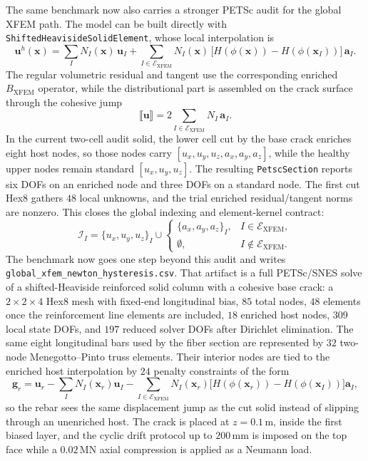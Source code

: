 The same benchmark now also carries a stronger PETSc audit for the global XFEM
path.  The model can be built directly with
\texttt{ShiftedHeavisideSolidElement}, whose local interpolation is
\[
  \mathbf{u}^h(\mathbf{x}) =
  \sum_I N_I(\mathbf{x})\,\mathbf{u}_I
  + \sum_{I\in\mathcal{E}_{\mathrm{XFEM}}}
    N_I(\mathbf{x})\,
    \bigl[H(\phi(\mathbf{x}))-H(\phi(\mathbf{x}_I))\bigr]\,
    \mathbf{a}_I .
\]
The regular volumetric residual and tangent use the corresponding enriched
\(B_{\mathrm{XFEM}}\) operator, while the distributional part is assembled on
the crack surface through the cohesive jump
\[
  \llbracket \mathbf{u} \rrbracket =
  2\sum_{I\in\mathcal{E}_{\mathrm{XFEM}}}
  N_I\,\mathbf{a}_I .
\]
In the current two-cell audit solid, the lower cell cut by the base crack
enriches eight host nodes, so those nodes carry
\([u_x,u_y,u_z,a_x,a_y,a_z]\), while the healthy upper nodes remain standard
\([u_x,u_y,u_z]\).  The resulting \texttt{PetscSection} reports six DOFs on an
enriched node and three DOFs on a standard node.  The first cut Hex8 gathers
\(48\) local unknowns, and the trial enriched residual/tangent norms are
nonzero.  This closes the global indexing and element-kernel contract:
\[
  \mathcal{I}_I =
  \{u_x,u_y,u_z\}_I
  \cup
  \begin{cases}
    \{a_x,a_y,a_z\}_I, & I \in \mathcal{E}_{\mathrm{XFEM}},\\
    \emptyset,         & I \notin \mathcal{E}_{\mathrm{XFEM}}.
  \end{cases}
\]
The benchmark now goes one step beyond this audit and writes
\texttt{global\_xfem\_newton\_hysteresis.csv}.  That artifact is a full
PETSc/SNES solve of a shifted-Heaviside reinforced solid column with a cohesive
base crack: a \(2\times2\times4\) Hex8 mesh with fixed-end longitudinal bias,
\(85\) total nodes, \(48\) elements once the reinforcement line elements are
included, \(18\) enriched host nodes, \(309\) local state DOFs, and \(197\)
reduced solver DOFs after Dirichlet elimination.  The same eight longitudinal
bars used by the fiber section are represented by \(32\) two-node
Menegotto--Pinto truss elements.  Their interior nodes are tied to the enriched
host interpolation by \(24\) penalty constraints of the form
\[
  \mathbf{g}_r =
  \mathbf{u}_r
  - \sum_I N_I(\mathbf{x}_r)\mathbf{u}_I
  - \sum_{I\in\mathcal{E}_{\mathrm{XFEM}}}
    N_I(\mathbf{x}_r)
    \bigl[H(\phi(\mathbf{x}_r))-H(\phi(\mathbf{x}_I))\bigr]\mathbf{a}_I ,
\]
so the rebar sees the same displacement jump as the cut solid instead of
slipping through an unenriched host.  The crack is placed at
\(z=0.1\,\mathrm{m}\), inside the first biased layer, and the cyclic drift
protocol up to \(200\,\mathrm{mm}\) is imposed on the top face while a
\(0.02\,\mathrm{MN}\) axial compression is applied as a Neumann load.

